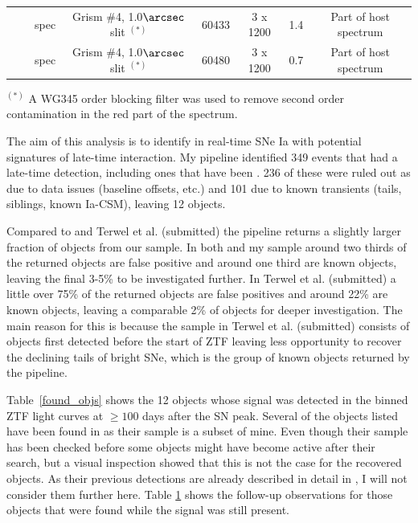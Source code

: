 \documentclass[a4paper,oneside,12pt, class=Latex/Classes/PhDthesisPSnPDF, crop=false]{standalone}
\begin{document}
\begin{table}
{\begin{tabular}{cccccccc}
        & & spec & Grism \#4, 1.0$\arcsec$ slit $^{(*)}$ & 60433 & 3 x 1200 & 1.4 & Part of host spectrum\\
        & & spec & Grism \#4, 1.0$\arcsec$ slit $^{(*)}$ & 60480 & 3 x 1200 & 0.7 & Part of host spectrum\\
        \hline
    \end{tabular}
    }    
    \begin{flushleft}
        $^{(*)}$ A WG345 order blocking filter was used to remove second order contamination in the red part of the spectrum.
    \end{flushleft}
    \label{followups}
\end{table}

The aim of this analysis is to identify in real-time SNe Ia with potential signatures of late-time interaction. My pipeline identified 349 events that had a late-time detection, including ones that have been \citet{Terwel_2024_paper1}. 236 of these were ruled out as due to data issues (baseline offsets, etc.) and 101 due to known transients (tails, siblings, known Ia-CSM), leaving 12 objects.

Compared to \citet{Terwel_2024_paper1} and Terwel et al. (submitted) the pipeline returns a slightly larger fraction of objects from our sample. In both \citet{Terwel_2024_paper1} and my sample around two thirds of the returned objects are false positive and around one third are known objects, leaving the final 3-5\% to be investigated further. In Terwel et al. (submitted) a little over 75\% of the returned objects are false positives and around 22\% are known objects, leaving a comparable 2\% of objects for deeper investigation. The main reason for this is because the sample in Terwel et al. (submitted) consists of objects first detected before the start of ZTF leaving less opportunity to recover the declining tails of bright SNe, which is the group of known objects returned by the pipeline.

Table~\ref{found_objs} shows the 12 objects whose signal was detected in the binned ZTF light curves at $\geq100$ days after the SN peak. Several of the objects listed have been found in \citet{Terwel_2024_paper1} as their sample is a subset of mine. Even though their sample has been checked before some objects might have become active after their search, but a visual inspection showed that this is not the case for the recovered objects. As their previous detections are already described in detail in \citet{Terwel_2024_paper1}, I will not consider them further here. Table \ref{followups} shows the follow-up observations for those objects that were found while the signal was still present. 
\end{document}
